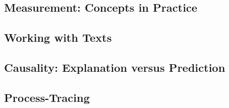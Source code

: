 \documentclass[12pt,a4paper]{article}
\begin{document}
\subsection{Measurement: Concepts in Practice}

\subsection{Working with Texts}

\subsection{Causality: Explanation versus Prediction}


\subsection{Process-Tracing}
\end{document}
